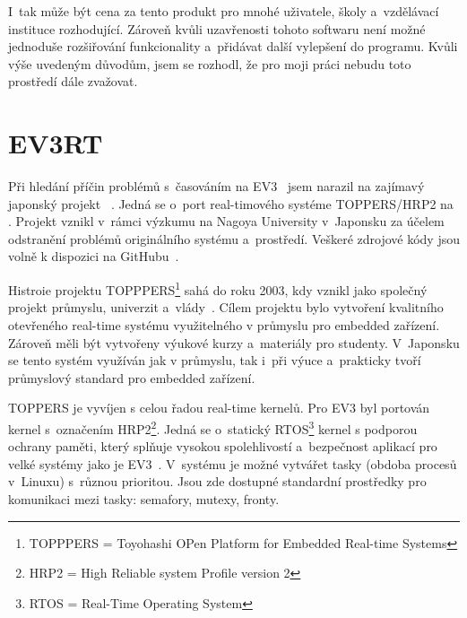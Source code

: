 I~tak může být cena za tento produkt pro mnohé uživatele, školy a~vzdělávací instituce rozhodující.
Zároveň kvůli uzavřenosti tohoto softwaru není možné jednoduše rozšiřování funkcionality a~přidávat další vylepšení do programu. 
Kvůli výše uvedeným důvodům, jsem se rozhodl, že pro moji práci nebudu toto prostředí dále zvažovat.	


\section{EV3RT}
\label{lego-EV3RT}

Při hledání příčin problémů s~časováním na EV3~\cite{legoMindstormsEV3_ev3dev-issue_constant-loop-time} jsem narazil na zajímavý japonský projekt \evRT{}~\cite{legoProgramingPlatform_EV3RT-git-web}.
Jedná se o~port real-timového systéme TOPPERS/HRP2 na \legoEV{}.
Projekt \evRT{} vznikl v~rámci výzkumu na Nagoya University v~Japonsku za účelem odstranění problémů originálního \lego{} systému a~prostředí. 
Veškeré zdrojové kódy jsou volně k dispozici na GitHubu~\cite{legoProgramingPlatform_EV3RT-github}. 

Histroie projektu TOPPPERS\footnote{TOPPPERS = Toyohashi OPen Platform for Embedded Real-time Systems} sahá do roku 2003, kdy vznikl jako společný projekt průmyslu, univerzit a~vlády~\cite{legoProgramingPlatform_TOPPERS}. 
Cílem projektu bylo vytvoření kvalitního otevřeného real-time systému využitelného v průmyslu pro embedded zařízení. 
Zároveň měli být vytvořeny výukové kurzy a~materiály pro studenty.
V~Japonsku se tento systém využíván jak v průmyslu, tak i~při výuce a~prakticky tvoří průmyslový standard pro embedded zařízení. 

TOPPERS je vyvíjen s celou řadou real-time kernelů. Pro EV3 byl portován kernel s~označením HRP2\footnote{HRP2 = High Reliable system Profile version 2}.
Jedná se o~statický RTOS\footnote{RTOS = Real-Time Operating System} kernel s podporou ochrany paměti, který splňuje vysokou spolehlivostí a~bezpečnost aplikací pro velké systémy jako je EV3~\cite{legoProgramingPlatform_EV3RT-paper}.
V~systému je možné vytvářet tasky (obdoba procesů v~Linuxu) s~různou prioritou. 
Jsou zde dostupné standardní prostředky pro komunikaci mezi tasky: semafory, mutexy, fronty.

